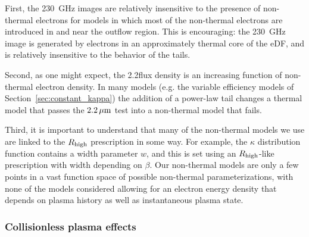 First, the 230~GHz images are relatively insensitive to the presence of non-thermal electrons for models in which most of the non-thermal electrons are introduced in and near the outflow region.
This is encouraging: the 230~GHz image is generated by electrons in an approximately thermal core of the eDF, and is relatively insensitive to the behavior of the tails.

Second, as one might expect, the 2.2\um flux density is an increasing function of non-thermal electron density.
In many models (e.g. the variable efficiency models of Section~\ref{sec:constant_kappa}) the addition of a power-law tail changes a thermal model that passes the $2.2\,\mu\mathrm{m}$ test into a non-thermal model that fails.

Third, it is important to understand that many of the non-thermal models we use are linked to the $R_\mathrm{high}$ prescription in some way.
For example, the $\kappa$ distribution function contains a width parameter $w$, and this is set using an $R_\mathrm{high}$-like prescription with width depending on $\beta$.
Our non-thermal models are only a few points in a vast function space of possible non-thermal parameterizations, with none of the models considered allowing for an electron energy density that depends on plasma history as well as instantaneous plasma state.

\subsubsection{Collisionless plasma effects}

